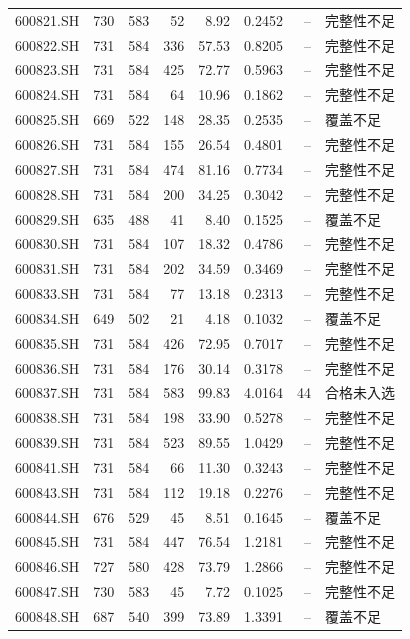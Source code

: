 \documentclass[10pt,a4paper]{article}
\begin{document}
\begin{longtable}{lrrr r r r l}
600821.SH & 730 & 583 & 52 & 8.92 & 0.2452 & -- & 完整性不足\\
600822.SH & 731 & 584 & 336 & 57.53 & 0.8205 & -- & 完整性不足\\
600823.SH & 731 & 584 & 425 & 72.77 & 0.5963 & -- & 完整性不足\\
600824.SH & 731 & 584 & 64 & 10.96 & 0.1862 & -- & 完整性不足\\
600825.SH & 669 & 522 & 148 & 28.35 & 0.2535 & -- & 覆盖不足\\
600826.SH & 731 & 584 & 155 & 26.54 & 0.4801 & -- & 完整性不足\\
600827.SH & 731 & 584 & 474 & 81.16 & 0.7734 & -- & 完整性不足\\
600828.SH & 731 & 584 & 200 & 34.25 & 0.3042 & -- & 完整性不足\\
600829.SH & 635 & 488 & 41 & 8.40 & 0.1525 & -- & 覆盖不足\\
600830.SH & 731 & 584 & 107 & 18.32 & 0.4786 & -- & 完整性不足\\
600831.SH & 731 & 584 & 202 & 34.59 & 0.3469 & -- & 完整性不足\\
600833.SH & 731 & 584 & 77 & 13.18 & 0.2313 & -- & 完整性不足\\
600834.SH & 649 & 502 & 21 & 4.18 & 0.1032 & -- & 覆盖不足\\
600835.SH & 731 & 584 & 426 & 72.95 & 0.7017 & -- & 完整性不足\\
600836.SH & 731 & 584 & 176 & 30.14 & 0.3178 & -- & 完整性不足\\
600837.SH & 731 & 584 & 583 & 99.83 & 4.0164 & 44 & 合格未入选\\
600838.SH & 731 & 584 & 198 & 33.90 & 0.5278 & -- & 完整性不足\\
600839.SH & 731 & 584 & 523 & 89.55 & 1.0429 & -- & 完整性不足\\
600841.SH & 731 & 584 & 66 & 11.30 & 0.3243 & -- & 完整性不足\\
600843.SH & 731 & 584 & 112 & 19.18 & 0.2276 & -- & 完整性不足\\
600844.SH & 676 & 529 & 45 & 8.51 & 0.1645 & -- & 覆盖不足\\
600845.SH & 731 & 584 & 447 & 76.54 & 1.2181 & -- & 完整性不足\\
600846.SH & 727 & 580 & 428 & 73.79 & 1.2866 & -- & 完整性不足\\
600847.SH & 730 & 583 & 45 & 7.72 & 0.1025 & -- & 完整性不足\\
600848.SH & 687 & 540 & 399 & 73.89 & 1.3391 & -- & 覆盖不足\\

\end{longtable}
\end{document}
